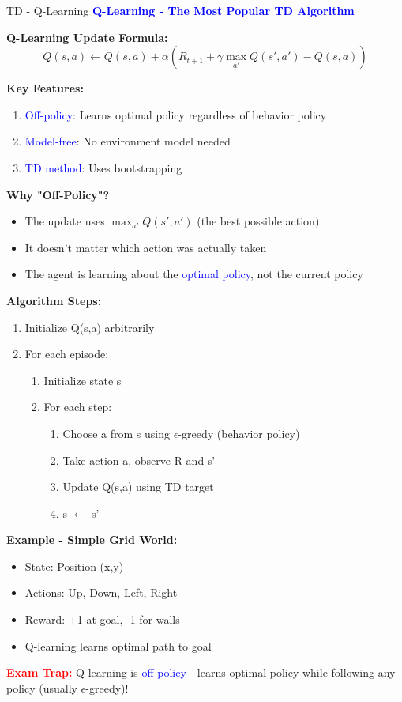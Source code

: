 \documentclass[8pt]{beamer}
\begin{document}
	\begin{frame}{TD - Q-Learning}
		\fontsize{6.5}{7.5}\selectfont
		\textcolor{blue}{\textbf{Q-Learning - The Most Popular TD Algorithm}}
		
		\textbf{Q-Learning Update Formula:}
		\[
		Q(s,a) \leftarrow Q(s,a) + \alpha(R_{t+1} + \gamma \max_{a'} Q(s',a') - Q(s,a))
		\]
		
		\textbf{Key Features:}
		\begin{enumerate}
			\item \textcolor{blue}{Off-policy}: Learns optimal policy regardless of behavior policy
			\item \textcolor{blue}{Model-free}: No environment model needed
			\item \textcolor{blue}{TD method}: Uses bootstrapping
		\end{enumerate}
		
		\textbf{Why "Off-Policy"?}
		\begin{itemize}
			\item The update uses $\max_{a'} Q(s',a')$ (the best possible action)
			\item It doesn't matter which action was actually taken
			\item The agent is learning about the \textcolor{blue}{optimal policy}, not the current policy
		\end{itemize}
		
		\textbf{Algorithm Steps:}
		\begin{enumerate}
			\item Initialize Q(s,a) arbitrarily
			\item For each episode:
			\begin{enumerate}
				\item Initialize state s
				\item For each step:
				\begin{enumerate}
					\item Choose a from s using $\epsilon$-greedy (behavior policy)
					\item Take action a, observe R and s'
					\item Update Q(s,a) using TD target
					\item s $\leftarrow$ s'
				\end{enumerate}
			\end{enumerate}
		\end{enumerate}
		
		\textbf{Example - Simple Grid World:}
		\begin{itemize}
			\item State: Position (x,y)
			\item Actions: Up, Down, Left, Right
			\item Reward: +1 at goal, -1 for walls
			\item Q-learning learns optimal path to goal
		\end{itemize}
		
		\textcolor{red}{\textbf{Exam Trap:}} Q-learning is \textcolor{blue}{off-policy} - learns optimal policy while following any policy (usually $\epsilon$-greedy)!
	\end{frame}
	
\end{document}
